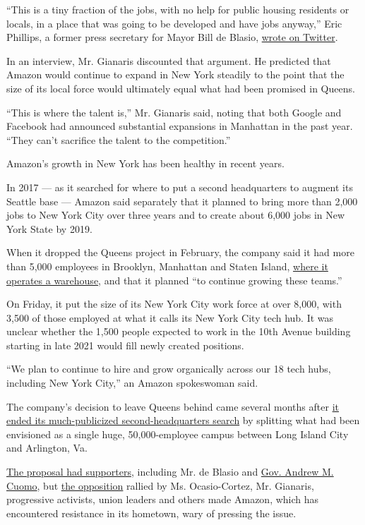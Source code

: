 ``This is a tiny fraction of the jobs, with no help for public housing
residents or locals, in a place that was going to be developed and have
jobs anyway,'' Eric Phillips, a former press secretary for Mayor Bill de
Blasio,
\href{https://twitter.com/EricFPhillips/status/1203107707428974594}{wrote
on Twitter}.

In an interview, Mr. Gianaris discounted that argument. He predicted
that Amazon would continue to expand in New York steadily to the point
that the size of its local force would ultimately equal what had been
promised in Queens.

``This is where the talent is,'' Mr. Gianaris said, noting that both
Google and Facebook had announced substantial expansions in Manhattan in
the past year. ``They can't sacrifice the talent to the competition.''

Amazon's growth in New York has been healthy in recent years.

In 2017 --- as it searched for where to put a second headquarters to
augment its Seattle base --- Amazon said separately that it planned to
bring more than 2,000 jobs to New York City over three years and to
create about 6,000 jobs in New York State by 2019.

When it dropped the Queens project in February, the company said it had
more than 5,000 employees in Brooklyn, Manhattan and Staten Island,
\href{https://www.nytimes3xbfgragh.onion/2019/03/20/business/economy/amazon-warehouse-labor.html}{where
it operates a warehouse}, and that it planned ``to continue growing
these teams.''

On Friday, it put the size of its New York City work force at over
8,000, with 3,500 of those employed at what it calls its New York City
tech hub. It was unclear whether the 1,500 people expected to work in
the 10th Avenue building starting in late 2021 would fill newly created
positions.

``We plan to continue to hire and grow organically across our 18 tech
hubs, including New York City,'' an Amazon spokeswoman said.

The company's decision to leave Queens behind came several months after
\href{https://www.nytimes3xbfgragh.onion/2018/11/05/nyregion/amazon-hq2-long-island-city.html}{it
ended its much-publicized second-headquarters search} by splitting what
had been envisioned as a single huge, 50,000-employee campus between
Long Island City and Arlington, Va.

\href{https://www.nytimes3xbfgragh.onion/2019/02/14/nyregion/amazon-long-island-city.html}{The
proposal had supporters}, including Mr. de Blasio and
\href{https://www.nytimes3xbfgragh.onion/2019/02/28/nyregion/amazon-hq2-nyc.html}{Gov.
Andrew M. Cuomo}, but
\href{https://www.nytimes3xbfgragh.onion/2019/02/12/nyregion/amazon-nyc-hq2.html}{the
opposition} rallied by Ms. Ocasio-Cortez, Mr. Gianaris, progressive
activists, union leaders and others made Amazon, which has encountered
resistance in its hometown, wary of pressing the issue.

